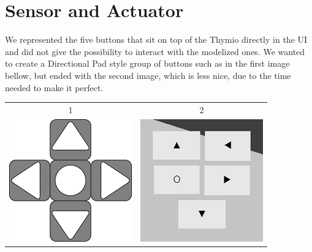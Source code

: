 \documentclass{scrbook}
\begin{document}
\section{Sensor and Actuator}

We represented the five buttons that sit on top of the Thymio directly in the UI and did not give the possibility to interact with the modelized ones. We wanted to create a Directional Pad style group of buttons such as in the first image bellow, 
but ended with the second image, which is less nice, due to the time needed to make it perfect.

\begin{center}
  \begin{tabular}{c c}
	  1  & 2 \\
    \includegraphics{dpad} & \includegraphics{fake_dpad}
  \end{tabular}
\end{center}
\end{document}
